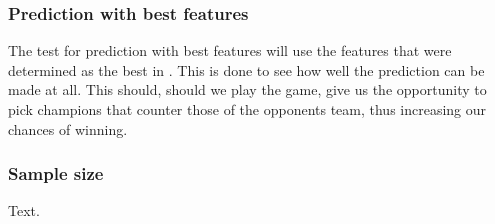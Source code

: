 \subsubsection{Prediction with best features}
The test for prediction with best features will use the features that were determined as the best in . This is done to see how well the prediction can be made at all. This should, should we play the game, give us the opportunity to pick champions that counter those of the opponents team, thus increasing our chances of winning.
\subsubsection{Sample size}
Text.


